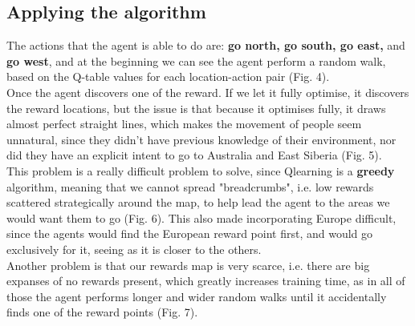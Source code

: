 \documentclass[11pt]{article}
\begin{document}
\begin{multicols}{2}
\subsection{Applying the algorithm}
The actions that the agent is able to do are: \textbf{go north, go south, go east,} and \textbf{go west}, and at the beginning we can see the agent perform a random walk, based on the Q-table values for each location-action pair (Fig. 4).\\
Once the agent discovers one of the reward. If we let it fully optimise, it discovers the reward locations, but the issue is that because it optimises fully, it draws almost perfect straight lines, which makes the movement of people seem unnatural, since they didn't have previous knowledge of their environment, nor did they have an explicit intent to go to Australia and East Siberia (Fig. 5).\\
This problem is a really difficult problem to solve, since Qlearning is a \textbf{greedy} algorithm, meaning that we cannot spread "breadcrumbs", i.e. low rewards scattered strategically around the map, to help lead the agent to the areas we would want them to go (Fig. 6). This also made incorporating Europe difficult, since the agents would find the European reward point first, and would go exclusively for it, seeing as it is closer to the others.\\
Another problem is that our rewards map is very scarce, i.e. there are big expanses of no rewards present, which greatly increases training time, as in all of those the agent performs longer and wider random walks until it accidentally finds one of the reward points (Fig. 7).
\end{multicols}
\end{document}
